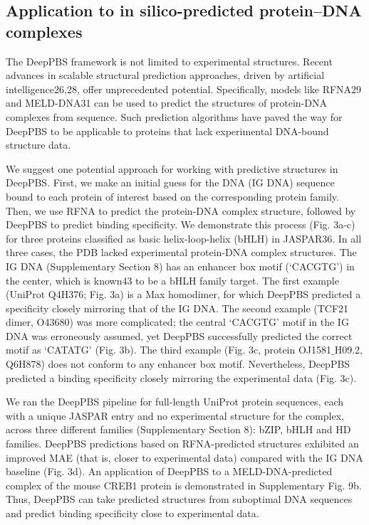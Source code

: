 \subsection{Application to in silico-predicted protein–DNA complexes}
The DeepPBS framework is not limited to experimental structures. Recent advances in scalable structural prediction approaches, driven by artificial intelligence26,28, offer unprecedented potential. Specifically, models like RFNA29 and MELD-DNA31 can be used to predict the structures of protein-DNA complexes from sequence. Such prediction algorithms have paved the way for DeepPBS to be applicable to proteins that lack experimental DNA-bound structure data.
\par
We suggest one potential approach for working with predictive structures in DeepPBS. First, we make an initial guess for the DNA (IG DNA) sequence bound to each protein of interest based on the corresponding protein family. Then, we use RFNA to predict the protein-DNA complex structure, followed by DeepPBS to predict binding specificity. We demonstrate this process (Fig. 3a-c) for three proteins classified as basic helix-loop-helix (bHLH) in JASPAR36. In all three cases, the PDB lacked experimental protein-DNA complex structures. The IG DNA (Supplementary Section 8) has an enhancer box motif (‘CACGTG’) in the center, which is known43 to be a bHLH family target. The first example (UniProt Q4H376; Fig. 3a) is a Max homodimer, for which DeepPBS predicted a specificity closely mirroring that of the IG DNA. The second example (TCF21 dimer, O43680) was more complicated; the central ‘CACGTG’ motif in the IG DNA was erroneously assumed, yet DeepPBS successfully predicted the correct motif as ‘CATATG’ (Fig. 3b). The third example (Fig. 3c, protein OJ1581$\_$H09.2, Q6H878) does not conform to any enhancer box motif. Nevertheless, DeepPBS predicted a binding specificity closely mirroring the experimental data (Fig. 3c).
\par
We ran the DeepPBS pipeline for full-length UniProt protein sequences, each with a unique JASPAR entry and no experimental structure for the complex, across three different families (Supplementary Section 8): bZIP, bHLH and HD families. DeepPBS predictions based on RFNA-predicted structures exhibited an improved MAE (that is, closer to experimental data) compared with the IG DNA baseline (Fig. 3d). An application of DeepPBS to a MELD-DNA-predicted complex of the mouse CREB1 protein is demonstrated in Supplementary Fig. 9b. Thus, DeepPBS can take predicted structures from suboptimal DNA sequences and predict binding specificity close to experimental data.
